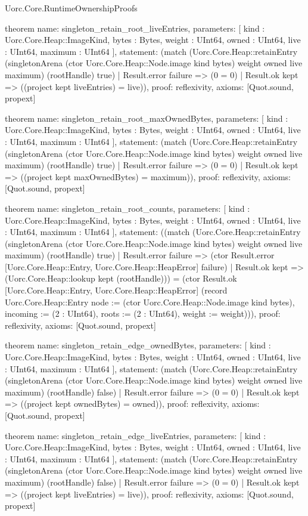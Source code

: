 \begin{lexlean}{Uorc.Core.RuntimeOwnershipProofs}
\begin{semanticmodule}
theorem{
  name: singleton_retain_root_liveEntries,
  parameters: [
    kind : Uorc.Core.Heap::ImageKind,
    bytes : Bytes,
    weight : UInt64,
    owned : UInt64,
    live : UInt64,
    maximum : UInt64
  ],
  statement: (match (Uorc.Core.Heap::retainEntry (singletonArena (ctor Uorc.Core.Heap::Node.image kind bytes) weight owned live maximum) (rootHandle) true)
    | Result.error failure => (0 = 0)
    | Result.ok kept => ((project kept liveEntries) = live)),
  proof: reflexivity{},
  axioms: [Quot.sound, propext]
}

theorem{
  name: singleton_retain_root_maxOwnedBytes,
  parameters: [
    kind : Uorc.Core.Heap::ImageKind,
    bytes : Bytes,
    weight : UInt64,
    owned : UInt64,
    live : UInt64,
    maximum : UInt64
  ],
  statement: (match (Uorc.Core.Heap::retainEntry (singletonArena (ctor Uorc.Core.Heap::Node.image kind bytes) weight owned live maximum) (rootHandle) true)
    | Result.error failure => (0 = 0)
    | Result.ok kept => ((project kept maxOwnedBytes) = maximum)),
  proof: reflexivity{},
  axioms: [Quot.sound, propext]
}

theorem{
  name: singleton_retain_root_counts,
  parameters: [
    kind : Uorc.Core.Heap::ImageKind,
    bytes : Bytes,
    weight : UInt64,
    owned : UInt64,
    live : UInt64,
    maximum : UInt64
  ],
  statement: ((match (Uorc.Core.Heap::retainEntry (singletonArena (ctor Uorc.Core.Heap::Node.image kind bytes) weight owned live maximum) (rootHandle) true)
    | Result.error failure => (ctor Result.error [Uorc.Core.Heap::Entry, Uorc.Core.Heap::HeapError] failure)
    | Result.ok kept => (Uorc.Core.Heap::lookup kept (rootHandle))) = (ctor Result.ok [Uorc.Core.Heap::Entry, Uorc.Core.Heap::HeapError] (record Uorc.Core.Heap::Entry {node := (ctor Uorc.Core.Heap::Node.image kind bytes), incoming := (2 : UInt64), roots := (2 : UInt64), weight := weight}))),
  proof: reflexivity{},
  axioms: [Quot.sound, propext]
}

theorem{
  name: singleton_retain_edge_ownedBytes,
  parameters: [
    kind : Uorc.Core.Heap::ImageKind,
    bytes : Bytes,
    weight : UInt64,
    owned : UInt64,
    live : UInt64,
    maximum : UInt64
  ],
  statement: (match (Uorc.Core.Heap::retainEntry (singletonArena (ctor Uorc.Core.Heap::Node.image kind bytes) weight owned live maximum) (rootHandle) false)
    | Result.error failure => (0 = 0)
    | Result.ok kept => ((project kept ownedBytes) = owned)),
  proof: reflexivity{},
  axioms: [Quot.sound, propext]
}

theorem{
  name: singleton_retain_edge_liveEntries,
  parameters: [
    kind : Uorc.Core.Heap::ImageKind,
    bytes : Bytes,
    weight : UInt64,
    owned : UInt64,
    live : UInt64,
    maximum : UInt64
  ],
  statement: (match (Uorc.Core.Heap::retainEntry (singletonArena (ctor Uorc.Core.Heap::Node.image kind bytes) weight owned live maximum) (rootHandle) false)
    | Result.error failure => (0 = 0)
    | Result.ok kept => ((project kept liveEntries) = live)),
  proof: reflexivity{},
  axioms: [Quot.sound, propext]
}


\end{semanticmodule}
\end{lexlean}
